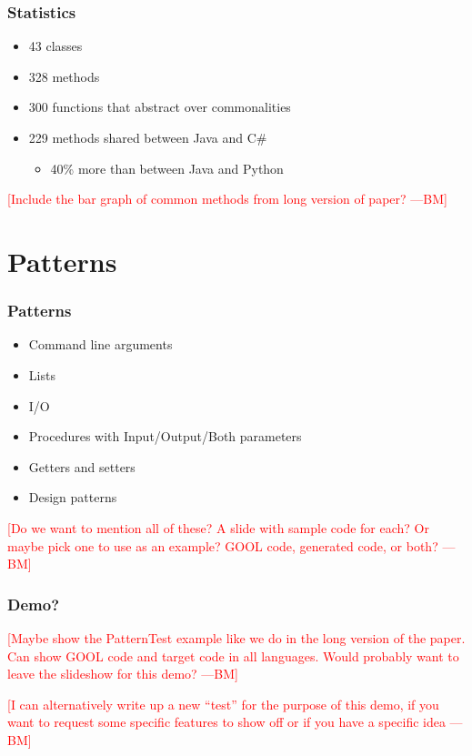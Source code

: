 \documentclass{beamer}
\newcommand{\authornote}[3]{\textcolor{#1}{[#3 ---#2]}}
\newcommand{\bmac}[1]{\authornote{red}{BM}{#1}}
\newcommand{\Csharp}{C\#}
\begin{document}

\begin{frame}

\frametitle{Statistics}

\begin{itemize}
	\item 43 classes
	\item 328 methods
	\item 300 functions that abstract over commonalities
	\item 229 methods shared between Java and \Csharp
	\begin{itemize}
	    \item 40\% more than between Java and Python
	\end{itemize}
\end{itemize}

\bmac{Include the bar graph of common methods from long version of paper?}

\end{frame}


\section[Patterns]{Patterns}


\begin{frame}

\frametitle{Patterns}

\begin{itemize}
	\item Command line arguments
	\item Lists
	\item I/O
	\item Procedures with Input/Output/Both parameters
	\item Getters and setters
	\item Design patterns
\end{itemize}

\bmac{Do we want to mention all of these? A slide with sample code for each? Or 
maybe pick one to use as an example? GOOL code, generated code, or both?}
\end{frame}


\begin{frame}

\frametitle{Demo?}

\bmac{Maybe show the PatternTest example like we do in the long version of the 
paper. Can show GOOL code and target code in all languages. Would probably want 
to leave the slideshow for this demo?}

\bmac{I can alternatively write up a new ``test'' for the purpose of this demo, 
if you want to request some specific features to show off or if you have a 
specific idea}

\end{frame}
\end{document}
